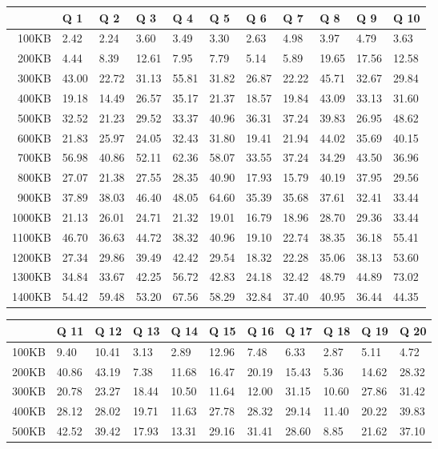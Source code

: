 
\begin {table}[htpb]
\centering
\begin{tabular}{r|l|l|l|l|l|l|l|l|l|l}
&Q 1&Q 2&Q 3&Q 4&Q 5&Q 6&Q 7&Q 8&Q 9&Q 10\\
\hline
100KB&2.42&2.24&3.60&3.49&3.30&2.63&4.98&3.97&4.79&3.63\\
200KB&4.44&8.39&12.61&7.95&7.79&5.14&5.89&19.65&17.56&12.58\\
300KB&43.00&22.72&31.13&55.81&31.82&26.87&22.22&45.71&32.67&29.84\\
400KB&19.18&14.49&26.57&35.17&21.37&18.57&19.84&43.09&33.13&31.60\\
500KB&32.52&21.23&29.52&33.37&40.96&36.31&37.24&39.83&26.95&48.62\\
600KB&21.83&25.97&24.05&32.43&31.80&19.41&21.94&44.02&35.69&40.15\\
700KB&56.98&40.86&52.11&62.36&58.07&33.55&37.24&34.29&43.50&36.96\\
800KB&27.07&21.38&27.55&28.35&40.90&17.93&15.79&40.19&37.95&29.56\\
900KB&37.89&38.03&46.40&48.05&64.60&35.39&35.68&37.61&32.41&33.44\\
1000KB&21.13&26.01&24.71&21.32&19.01&16.79&18.96&28.70&29.36&33.44\\
1100KB&46.70&36.63&44.72&38.32&40.96&19.10&22.74&38.35&36.18&55.41\\
1200KB&27.34&29.86&39.49&42.42&29.54&18.32&22.28&35.06&38.13&53.60\\
1300KB&34.84&33.67&42.25&56.72&42.83&24.18&32.42&48.79&44.89&73.02\\
1400KB&54.42&59.48&53.20&67.56&58.29&32.84&37.40&40.95&36.44&44.35\\
\end{tabular}
\newline
\vspace*{0.5 cm}
\newline
\begin{tabular}{r|l|l|l|l|l|l|l|l|l|l}
&Q 11&Q 12&Q 13&Q 14&Q 15&Q 16&Q 17&Q 18&Q 19&Q 20\\
\hline
100KB&9.40&10.41&3.13&2.89&12.96&7.48&6.33&2.87&5.11&4.72\\
200KB&40.86&43.19&7.38&11.68&16.47&20.19&15.43&5.36&14.62&28.32\\
300KB&20.78&23.27&18.44&10.50&11.64&12.00&31.15&10.60&27.86&31.42\\
400KB&28.12&28.02&19.71&11.63&27.78&28.32&29.14&11.40&20.22&39.83\\
500KB&42.52&39.42&17.93&13.31&29.16&31.41&28.60&8.85&21.62&37.10\\

\end{tabular}
\end{table}
